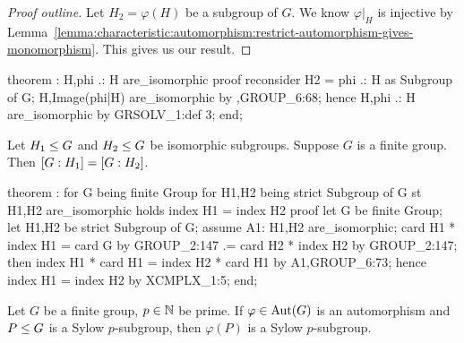 \begin{proof}[Proof outline]
Let $H_{2}=\varphi(H)$ be a subgroup of $G$. We know $\varphi|_{H}$ is
injective by Lemma~\ref{lemma:characteristic:automorphism:restrict-automorphism-gives-monomorphism}. This gives us our result.
\end{proof}

\nwenddocs{}\endmoddef\nwstartdeflinemarkup{}\nwenddeflinemarkup
theorem :
  H,phi .: H are_isomorphic
proof
  reconsider H2 = phi .: H as Subgroup of G;
  H,Image(phi|H) are_isomorphic by ,GROUP_6:68;
  hence H,phi .: H are_isomorphic by GRSOLV_1:def 3;
end;
\eatline
{}\nwendcode{}\nwdocspar
\begin{theorem}
Let $H_{1}\leq G$ and $H_{2}\leq G$ be isomorphic
subgroups. Suppose $G$ is a finite group. Then $[G : H_{1}]=[G : H_{2}]$.
\end{theorem}

\nwenddocs{}\endmoddef\nwstartdeflinemarkup{}\nwenddeflinemarkup
theorem :
  for G being finite Group
  for H1,H2 being strict Subgroup of G
  st H1,H2 are_isomorphic
  holds index H1 = index H2
proof
  let G be finite Group;
  let H1,H2 be strict Subgroup of G;
  assume A1: H1,H2 are_isomorphic;
  card H1 * index H1 = card G by GROUP_2:147
                    .= card H2 * index H2 by GROUP_2:147;
  then index H1 * card H1 = index H2 * card H1 by A1,GROUP_6:73;
  hence index H1 = index H2 by XCMPLX_1:5;
end;
\eatline
{}\nwendcode{}\nwdocspar
\begin{theorem}
Let $G$ be a finite group, $p\in\mathbb{N}$ be prime. If $\varphi\in\operatorname{Aut}(G)$ is
an automorphism and $P\leq G$ is a Sylow $p$-subgroup, then
$\varphi(P)$ is a Sylow $p$-subgroup.
\end{theorem}

